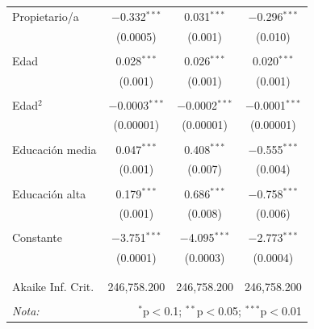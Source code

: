\documentclass[12pt,a4paper]{article}
\begin{document}
\begin{table}[!htbp]
\begin{tabular}{@{\extracolsep{5pt}}lccc}
 Propietario/a & $-$0.332$^{***}$ & 0.031$^{***}$ & $-$0.296$^{***}$ \\ 
  & (0.0005) & (0.001) & (0.010) \\ 
  & & & \\ 
 Edad & 0.028$^{***}$ & 0.026$^{***}$ & 0.020$^{***}$ \\ 
  & (0.001) & (0.001) & (0.001) \\ 
  & & & \\ 
 Edad$^{2}$ & $-$0.0003$^{***}$ & $-$0.0002$^{***}$ & $-$0.0001$^{***}$ \\ 
  & (0.00001) & (0.00001) & (0.00001) \\ 
  & & & \\ 
 Educación media & 0.047$^{***}$ & 0.408$^{***}$ & $-$0.555$^{***}$ \\ 
  & (0.001) & (0.007) & (0.004) \\ 
  & & & \\ 
 Educación alta & 0.179$^{***}$ & 0.686$^{***}$ & $-$0.758$^{***}$ \\ 
  & (0.001) & (0.008) & (0.006) \\ 
  & & & \\ 
 Constante & $-$3.751$^{***}$ & $-$4.095$^{***}$ & $-$2.773$^{***}$ \\ 
  & (0.0001) & (0.0003) & (0.0004) \\ 
  & & & \\ 
\hline \\[-1.8ex] 
Akaike Inf. Crit. & 246,758.200 & 246,758.200 & 246,758.200 \\ 
\hline 
\hline \\[-1.8ex] 
\textit{Nota:}  & \multicolumn{3}{r}{$^{*}$p$<$0.1; $^{**}$p$<$0.05; $^{***}$p$<$0.01} \\ 
\end{tabular} 
\end{table} 


\printbibliography
\end{document}
